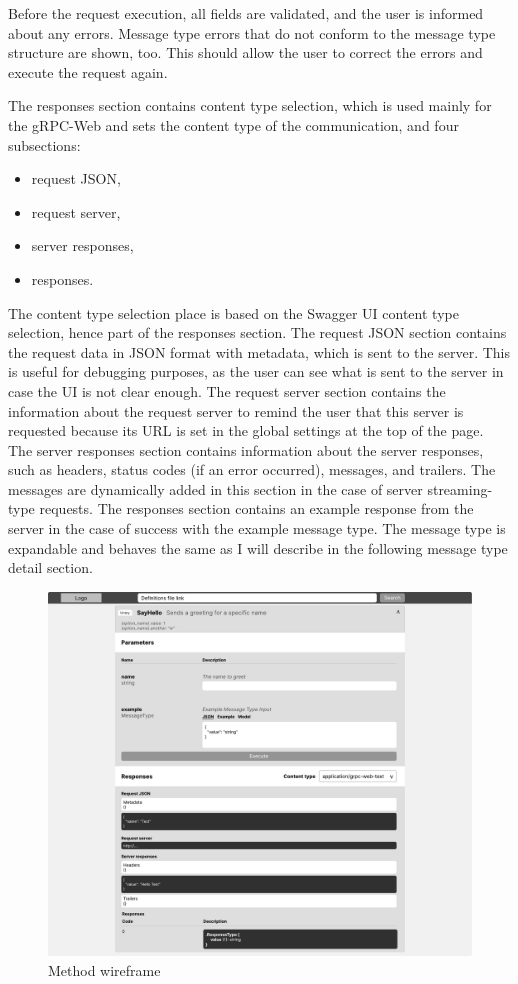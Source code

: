 Before the request execution, all fields are validated, and the user is informed about any errors.
Message type errors that do not conform to the message type structure are shown, too.
This should allow the user to correct the errors and execute the request again.

The responses section contains content type selection, which is used mainly for the gRPC-Web and sets the content type of the communication, and four subsections:
\begin{itemize}
    \item request JSON,
    \item request server,
    \item server responses,
    \item responses.
\end{itemize}

The content type selection place is based on the Swagger UI content type selection, hence part of the responses section.
The request JSON section contains the request data in JSON format with metadata, which is sent to the server.
This is useful for debugging purposes, as the user can see what is sent to the server in case the UI is not clear enough.
The request server section contains the information about the request server to remind the user that this server is requested because its URL is set in the global settings at the top of the page.
The server responses section contains information about the server responses, such as headers, status codes (if an error occurred), messages, and trailers.
The messages are dynamically added in this section in the case of server streaming-type requests.
The responses section contains an example response from the server in the case of success with the example message type.
The message type is expandable and behaves the same as I will describe in the following message type detail section.


\begin{figure}[hbt!]
    \centering
    \captionsetup{justification=centering}
    \includegraphics[width=1.0\textwidth]{images/design/wireframes/method}
    \caption{Method wireframe}
    \label{fig:wireframe-method}
\end{figure}

